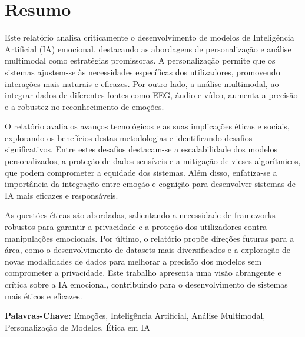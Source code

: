 \documentclass[a4paper,12pt]{report}
\begin{document}
	
	\newpage
	\thispagestyle{empty}
	\mbox{}
	\newpage
	
	
	\section*{Resumo}
	
	Este relatório analisa criticamente o desenvolvimento de modelos de Inteligência Artificial (IA) emocional, destacando as abordagens de personalização e análise multimodal como estratégias promissoras. A personalização permite que os sistemas ajustem-se às necessidades específicas dos utilizadores, promovendo interações mais naturais e eficazes. Por outro lado, a análise multimodal, ao integrar dados de diferentes fontes como EEG, áudio e vídeo, aumenta a precisão e a robustez no reconhecimento de emoções.
	
	O relatório avalia os avanços tecnológicos e as suas implicações éticas e sociais, explorando os benefícios destas metodologias e identificando desafios significativos. Entre estes desafios destacam-se a escalabilidade dos modelos personalizados, a proteção de dados sensíveis e a mitigação de vieses algorítmicos, que podem comprometer a equidade dos sistemas. Além disso, enfatiza-se a importância da integração entre emoção e cognição para desenvolver sistemas de IA mais eficazes e responsáveis.
	
	As questões éticas são abordadas, salientando a necessidade de frameworks robustos para garantir a privacidade e a proteção dos utilizadores contra manipulações emocionais. Por último, o relatório propõe direções futuras para a área, como o desenvolvimento de datasets mais diversificados e a exploração de novas modalidades de dados para melhorar a precisão dos modelos sem comprometer a privacidade. Este trabalho apresenta uma visão abrangente e crítica sobre a IA emocional, contribuindo para o desenvolvimento de sistemas mais éticos e eficazes.

	\vspace{4em}
	
	\noindent\textbf{Palavras-Chave:} \normalsize{Emoções, Inteligência Artificial, Análise Multimodal, Personalização de Modelos, Ética em IA}
	
	\newpage

	
	
\end{document}
